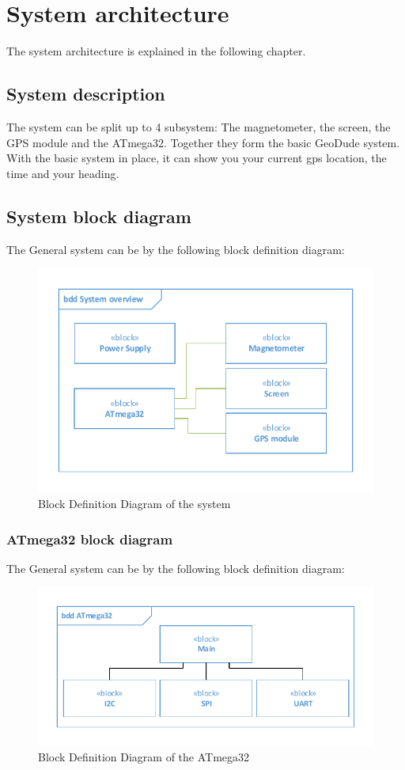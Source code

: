 \chapter{System architecture}
The system architecture is explained in the following chapter.

\section{System description}
The system can be split up to 4 subsystem: The magnetometer, the screen, the GPS module and the ATmega32. Together they form the basic GeoDude system. With the basic system in place, it can show you your current gps location, the time and your heading. \\


\section{System block diagram}
The General system can be by the following block definition diagram:\\
\begin{figure}[H]
	\centering
	\includegraphics[width=.8\textwidth]{billeder/SystemBDD}
	\caption{Block Definition Diagram of the system}
	\label{bdd:system}
\end{figure}


\subsection{ATmega32 block diagram}
The General system can be by the following block definition diagram:\\
\begin{figure}[H]
	\centering
	\includegraphics[width=.8\textwidth]{billeder/atmegaBDD}
	\caption{Block Definition Diagram of the ATmega32}
	\label{bdd:system}
\end{figure}

